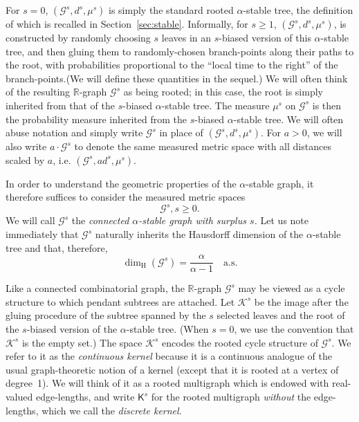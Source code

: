 \documentclass[10pt]{amsart}
\theoremstyle{definition}\newtheorem{defi}[theo]{Definition}\newtheorem{rema}[theo]{Remark}\newtheorem{exam}[theo]{Example}\newtheorem{exem}[theo]{Example}\newtheorem{nota}[theo]{Notation}
\newcommand{\rmH}{\mathrm{H}}
\newcommand{\cG}{\mathcal{G}}
\newcommand{\cK}{\mathcal{K}}
\newcommand{\sK}{\mathsf{K}}
\newcommand{\R}{\mathbb{R}}
\begin{document}
For $s=0$, $(\cG^s,d^s, \mu^s)$ is simply the standard rooted $\alpha$-stable tree, the definition of which is recalled in Section~\ref{sec:stable}. Informally, for $s \ge 1$, $(\cG^s,d^s, \mu^s)$, is constructed by randomly choosing $s$ leaves in an $s$-biased version of this $\alpha$-stable tree, and then gluing them to randomly-chosen branch-points along their paths to the root, with probabilities proportional to the ``local time to the right'' of the branch-points.\linebreak(We will define these quantities in the sequel.) We will often think of the resulting $\R$-graph $\cG^s$ as being rooted; in this case, the root is simply inherited from that of the $s$-biased $\alpha$-stable tree. The measure $\mu^s$ on $\cG^s$ is then the probability measure inherited from the $s$-biased $\alpha$-stable tree. We will often abuse notation and simply write $\cG^s$ in place of $(\cG^s, d^s, \mu^s)$. For $a > 0$, we will also write $a \cdot \cG^s$ to denote the same measured metric space with all distances scaled by $a$, i.e. $(\cG^s, a d^s, \mu^s)$.

In order to understand the geometric properties of the $\alpha$-stable graph, it therefore suffices to consider the measured metric spaces
\[
\cG^s, s \ge 0.
\]
We will call $\cG^s$ the \emph{connected $\alpha$-stable graph with surplus $s$.} Let us note immediately that $\cG^s$ naturally inherits the Hausdorff dimension of the $\alpha$-stable tree and that, therefore,
\[
\dim_{\rmH}(\cG^s)=\frac{\alpha}{\alpha-1} \quad \text{a.s.}
\]

Like a connected combinatorial graph, the $\R$-graph $\cG^s$ may be viewed as a cycle structure to which pendant subtrees are attached. Let $\cK^s$ be the image after the gluing procedure of the subtree spanned by the $s$ selected leaves and the root of the $s$-biased version of the $\alpha$-stable tree. (When $s=0$, we use the convention that $\cK^s$ is the empty set.) The space $\cK^s$ encodes the rooted cycle structure of $\cG^s$. We refer to it as the \emph{continuous kernel} because it is a continuous analogue of the usual graph-theoretic notion of a kernel (except that it is rooted at a vertex of degree~1). We will think of it as a rooted multigraph which is endowed with real-valued edge-lengths, and write $\sK^s$ for the rooted multigraph \emph{without} the edge-lengths, which we call the \emph{discrete kernel}.
\end{document}
